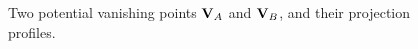 



\begin{figure}[t]
\centering
\begin{center}
\end{center}
\vspace*{0mm}
\caption{Two potential vanishing points ${ \bf V }_A$ and ${ \bf V }_B$, and
their projection profiles.}
\label{projprofs}
\end{figure}


